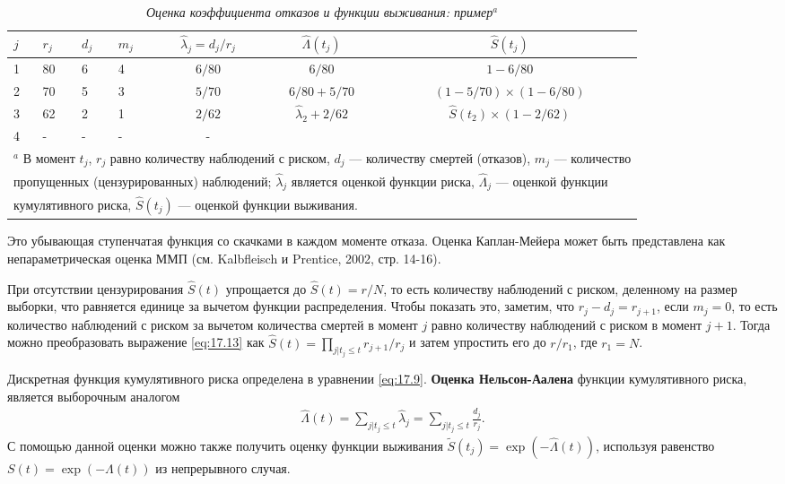     \begin{table}[!htbp]\caption{\textit{Оценка коэффициента отказов и функции выживания: пример}${}^a$}\label{tab:17.2}
    \begin{tabularx}{\textwidth}{X X X X c c c}
    \hline \hline
$j$ &$r_j$  &$d_j$  &$m_j$  &$\hat{\lambda}_j=d_j/r_j$ &$\hat{\Lambda}(t_j)$   &$\hat{S}(t_j)$\\
    \hline
1   &80     &6      &4      &$6/80$                    &$6/80$                  &$1-6/80$\\
2   &70     &5      &3      &$5/70$                    &$6/80+5/70$             &$(1-5/70)\times(1-6/80)$\\
3   &62     &2      &1      &$2/62$                    &$\hat{\lambda}_2+2/62$  &$\hat{S}(t_2)\times(1-2/62)$\\
4   &-      &-      &-      &-                                  &               &\\
    \hline \hline
\multicolumn{7}{l}{${}^a$ \scriptsize{В момент $t_j$, $r_j$ равно количеству наблюдений с риском, $d_j$ --- количеству смертей (отказов), $m_j$ --- количество}}\\[-0.15cm]
\multicolumn{7}{l}{\hspace{0.3cm}\scriptsize{пропущенных (цензурированных) наблюдений; $\hat{\lambda}_j$ является оценкой функции риска, $\hat{\Lambda}_j$ --- оценкой функции}}\\[-0.15cm]
\multicolumn{7}{l}{\hspace{0.3cm}\scriptsize{кумулятивного риска, $\hat{S}(t_j)$ --- оценкой функции выживания.}}
    \end{tabularx}
    \end{table}
Это убывающая ступенчатая функция со скачками в каждом моменте отказа. Оценка Каплан-Мейера может быть представлена как непараметрическая оценка ММП (см. Kalbfleisch и Prentice, 2002, стр. 14-16).

При отсутствии цензурирования $\hat{S}(t)$ упрощается до $\hat{S}(t)=r/N$, то есть количеству наблюдений с риском, деленному на размер выборки, что равняется единице за вычетом функции распределения. Чтобы показать это, заметим, что $r_j-d_j=r_{j+1}$, если $m_j=0$, то есть количество наблюдений с риском за вычетом количества смертей в момент $j$ равно количеству наблюдений с риском в момент $j+1$. Тогда можно преобразовать выражение \ref{eq:17.13} как $\hat{S}(t)=\prod_{j|t_j\le t} r_{j+1}/r_j$ и затем упростить его до $r/r_1$, где $r_1=N$.

Дискретная функция кумулятивного риска определена в уравнении \ref{eq:17.9}. \textbf{Оценка Нельсон-Аалена} функции кумулятивного риска, является выборочным аналогом
        \begin{align}
        \label{eq:17.14}
        \hat{\Lambda}(t)=\sum_{j|t_j\le t} \hat{\lambda}_j=\sum_{j|t_j\le t} \frac{d_j}{r_j}.
        \end{align}
С помощью данной оценки можно также получить оценку функции выживания $\tilde{S}(t_j)=\exp{(-\hat{\Lambda}(t))}$, используя равенство $S(t)=\exp{(-\Lambda(t))}$ из непрерывного случая.


